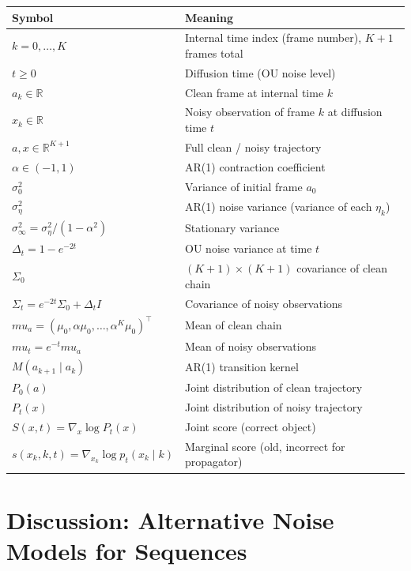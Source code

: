 \documentclass[12pt, a4paper]{article}
\def\ba{a}%
\def\bx{x}%
\def\bmu{mu}%
\def\bm#1{#1}%
\theoremstyle{definition}
\newcommand{\R}{\mathbb{R}}
\newcommand{\ba}{\bm{a}}
\newcommand{\bx}{\bm{x}}
\newcommand{\bmu}{\bm{\mu}}
\newcommand{\dt}{\Delta_t}
\begin{document}
\begin{center}
\renewcommand{\arraystretch}{1.4}
\begin{tabular}{ll}
\toprule
\textbf{Symbol} & \textbf{Meaning} \\
\midrule
$k = 0,\ldots,K$ & Internal time index (frame number), $K+1$ frames total \\
$t \geq 0$ & Diffusion time (OU noise level) \\
$a_k \in \R$ & Clean frame at internal time $k$ \\
$x_k \in \R$ & Noisy observation of frame $k$ at diffusion time $t$ \\
$\ba, \bx \in \R^{K+1}$ & Full clean / noisy trajectory \\
$\alpha \in (-1,1)$ & AR(1) contraction coefficient \\
$\sigma_0^2$ & Variance of initial frame $a_0$ \\
$\sigma_\eta^2$ & AR(1) noise variance (variance of each $\eta_k$) \\
$\sigma_\infty^2 = \sigma_\eta^2/(1-\alpha^2)$ & Stationary variance \\
$\dt = 1 - e^{-2t}$ & OU noise variance at time $t$ \\
$\Sigma_0$ & $(K+1)\times(K+1)$ covariance of clean chain \\
$\Sigma_t = e^{-2t}\Sigma_0+\dt I$ & Covariance of noisy observations \\
$\bmu_a = (\mu_0,\alpha\mu_0,\ldots,\alpha^K\mu_0)^\top$ & Mean of clean chain \\
$\bmu_t = e^{-t}\bmu_a$ & Mean of noisy observations \\
$M(a_{k+1}\mid a_k)$ & AR(1) transition kernel \\
$P_0(\ba)$ & Joint distribution of clean trajectory \\
$P_t(\bx)$ & Joint distribution of noisy trajectory \\
$\bm{S}(\bx,t) = \nabla_{\bx}\log P_t(\bx)$ & Joint score (correct object) \\
$s(x_k,k,t) = \nabla_{x_k}\log p_t(x_k\mid k)$ & Marginal score (old, incorrect for propagator) \\
\bottomrule
\end{tabular}
\end{center}

\section{Discussion: Alternative Noise Models for Sequences}
\label{sec:noise_discussion}
\end{document}
